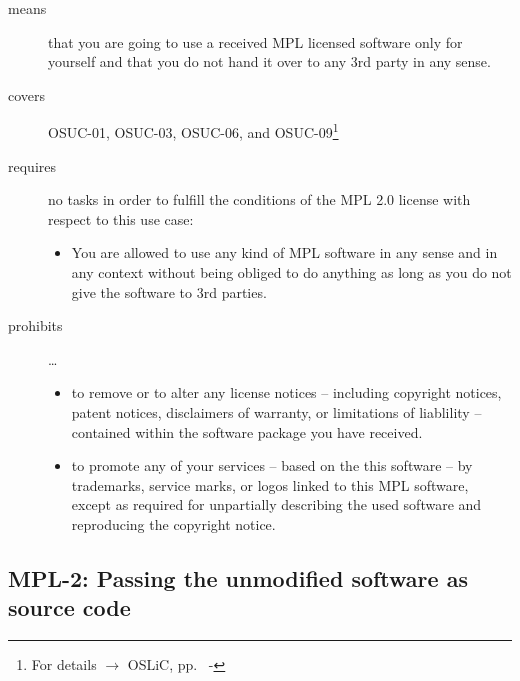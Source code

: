 \begin{description}

\item[means] that you are going to use a received MPL licensed software only
for yourself and that you do not hand it over to any 3rd party in any sense.

\item[covers] OSUC-01, OSUC-03, OSUC-06, and OSUC-09\footnote{For details 
$\rightarrow$ OSLiC, pp.\ \pageref{OSUC-01-DEF} - \pageref{OSUC-09-DEF}}

\item[requires] no tasks in order to fulfill the conditions of the MPL 2.0
license with respect to this use case:
  \begin{itemize}
    \item You are allowed to use any kind of MPL software in any sense and in
    any context without being obliged to do anything as long as you do not
    give the software to 3rd parties.
  \end{itemize}

\item[prohibits] \ldots
\begin{itemize}
  \item to remove or to alter any license notices -- including copyright
  notices, patent notices, disclaimers of warranty, or limitations of liablility
  -- contained within the software package you have received.
  \item to promote any of your services -- based on the this software -- by
  trademarks, service marks, or logos linked to this MPL software, except as
  required for unpartially describing the used software and reproducing the
  copyright notice.
\end{itemize}

\end{description}

\subsection{MPL-2: Passing the unmodified software as source code}
\label{OSUC-02-MPL} \label{OSUC-05-MPL} \label{OSUC-07-MPL} 

